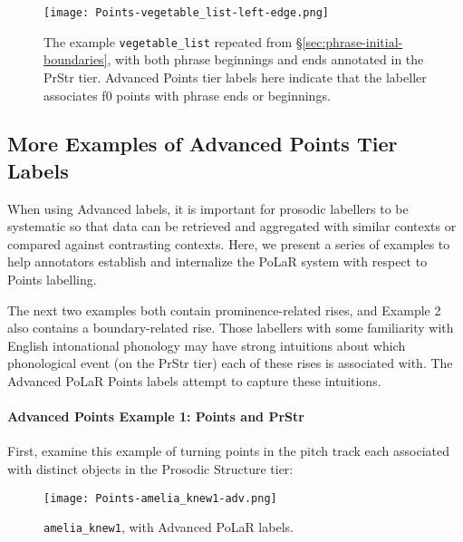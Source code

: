 \begin{figure}[H]
\centering
%
\texttt{[image: Points-vegetable\_list-left-edge.png]}
%
\caption[Advanced Points tier labels here indicate that the labeller associates f0 points with phrase ends or beginnings.]{The example \texttt{vegetable\_list} repeated from \S\ref{sec:phrase-initial-boundaries}, with both phrase beginnings and ends annotated in the PrStr tier. Advanced Points tier labels here indicate that the labeller associates f0 points with phrase ends or beginnings.%
\label{fig:vegetable list Points left edge Adv}%
}
\end{figure}


\subsection{More Examples of Advanced Points Tier Labels}\label{sec:more-examples-of-advanced-points-tier-labels}

When using Advanced labels, it is important for prosodic labellers to be systematic so that data can be retrieved and aggregated with similar contexts or compared against contrasting contexts. Here, we present a series of examples to help annotators establish and internalize the PoLaR system with respect to Points labelling.

The next two examples both contain prominence-related rises, and Example 2 also contains a boundary-related rise. Those labellers with some familiarity with English intonational phonology may have strong intuitions about which phonological event (on the PrStr tier) each of these rises is associated with. The Advanced PoLaR Points labels attempt to capture these intuitions.

\paragraph{Advanced Points Example 1: Points and PrStr}
First, examine this example of turning points in the pitch track each associated with distinct objects in the Prosodic Structure tier:

\begin{figure}[H]
\centering
%
\texttt{[image: Points-amelia\_knew1-adv.png]}
%
\caption{\texttt{amelia\_knew1}, with Advanced PoLaR labels.%
\label{fig:amelia_knew1 Points Adv}%
}
\end{figure}

